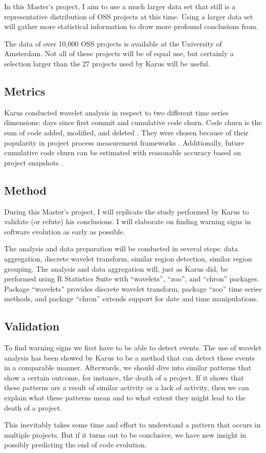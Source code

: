 In this Master's project, I aim to use a much larger data set that still is a
representative distribution of OSS projects at this time. Using a larger data
set will gather more statistical information to draw more profound conclusions
from.

The data of over 10,000 OSS projects is available at the University of
Amsterdam. Not all of these projects will be of equal use, but certainly a
selection larger than the 27 projects used by Karus will be useful.

\subsection{Metrics}
Karus conducted wavelet analysis in respect to two different time series
dimensions: days since first commit and cumulative code churn. Code churn is the
sum of code added, modified, and deleted \cite{elbaum}. They were chosen because
of their popularity in project process measurement frameworks \cite{karus2013}.
Additionally, future cumulative code churn can be estimated with reasonable
accuracy based on project snapshots \cite{dumas}.

\subsection{Method}
During this Master's project, I will replicate the study performed by Karus to
validate (or refute) his conclusions. I will elaborate on finding warning signs
in software evolution as early as possible.

The analysis and data preparation will be conducted in several steps: data
aggregation, discrete wavelet transform, similar region detection, similar
region grouping. The analysis and data aggregation will, just as Karus did, be
performed using R Statistics Suite with ``wavelets'', ``zoo'', and ``chron''
packages. Package ``wavelets'' provides discrete wavelet transform, package
``zoo'' time series methods, and package ``chron'' extends support for date and
time manipulations.

\subsection{Validation}
To find warning signs we first have to be able to detect events. The use
of wavelet analysis has been showed by Karus \cite{karus2013} to be a method
that can detect these events in a comparable manner.
Afterwards, we should dive into similar patterns that show a certain outcome,
for instance, the death of a project. If it shows that these patterns are a
result of similar activity or a lack of activity, then we can explain what these
patterns mean and to what extent they might lead to the death of a project.

This inevitably takes some time and effort to understand a pattern that occurs
in multiple projects. But if it turns out to be conclusive, we have new insight
in possibly predicting the end of code evolution.
